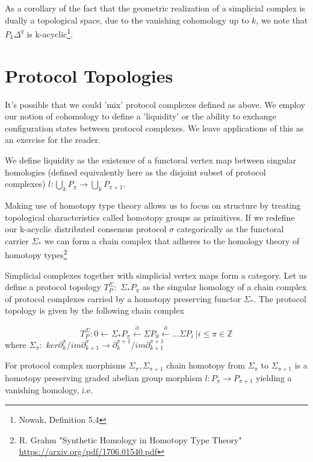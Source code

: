 \documentclass{article}
\begin{document}
As a corollary of the fact that the geometric realization of a simplicial complex is dually a topological space, due to the vanishing cohomology up to $k$, we note that $P_k\Delta^q$ is k-acyclic\footnote{Nowak, Definition 5.4}.

\section{Protocol Topologies}
It's possible that we could 'mix' protocol complexes defined as above. We employ our notion of cohomology to define a 'liquidity' or the ability to exchange configuration states between protocol complexes. We leave applications of this as an exercise for the reader.

We define liquidity as the existence of a functoral vertex map between singular homologies (defined equivalently here as the disjoint subset of protocol complexes) $l: \bigcup_{k} P_{\pi} \rightarrow \bigcup_{k} P_{\pi+1}$.

Making use of homotopy type theory allows us to focus on structure by treating topological characteristics called homotopy groups as primitives. If we redefine our k-acyclic distributed consensus protocol $\sigma$ categorically as the functoral carrier $\Sigma_{*}$  we can form a chain complex that adheres to the homology theory of homotopy types\footnote{R. Grahm "Synthetic Homology in Homotopy Type Theory" \url{https://arxiv.org/pdf/1706.01540.pdf}}

Simplicial complexes together with simplicial vertex maps form a category. Let us define a protocol topology $T^{\Sigma}_P: $ $\Sigma_{*}P_\pi$ as the singular homology of a chain complex of protocol complexes carried by a homotopy preserving functor $\Sigma_*$. The protocol topology is given by the following chain complex

\begin{equation} \label{eq1}
T^{\Sigma}_P: 0 \leftarrow \Sigma_{*}P_\pi \xleftarrow{\partial} \Sigma P_{0} \xleftarrow{\partial} \dots \Sigma P_i \ | i \leq \pi \in \mathbb{Z}
\end{equation} \label{eq1}
where $\Sigma_\pi: $ $ker \partial^{\pi}_{k}/im \partial^{\pi}_{k+1} \rightarrow \partial^{\pi+1}_{k} /im \partial^{\pi+1}_{k+1}$ 

For protocol complex morphisms $\Sigma_\pi, \Sigma_{\pi+1}$ chain homotopy from $\Sigma_\pi$ to $\Sigma_{\pi+1}$ is a homotopy preserving graded abelian group morphism $l: P_{\pi} \rightarrow P_{\pi+1}$ yielding a vanishing homology, i.e. 
\end{document}
